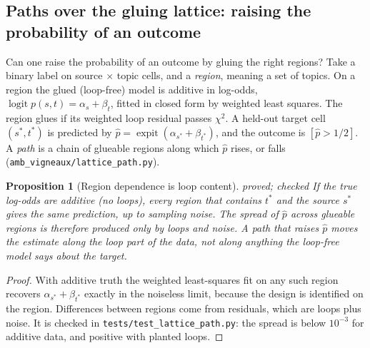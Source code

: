 \documentclass[11pt]{article}
\newtheorem{proposition}[theorem]{Proposition}
\theoremstyle{definition}
\theoremstyle{remark}
\newcommand{\st}[1]{\textsf{\small\color{gray}#1}}
\begin{document}
\subsection{Paths over the gluing lattice: raising the probability of an outcome}\label{sec:latticepath}
Can one raise the probability of an outcome by gluing the right regions? Take a binary label on source $\times$ topic cells, and a \emph{region}, meaning a set of topics. On a region the glued (loop-free) model is additive in log-odds, $\operatorname{logit}p(s,t)=\alpha_s+\beta_t$, fitted in closed form by weighted least squares. The region glues if its weighted loop residual passes $\chi^2$. A held-out target cell $(s^*,t^*)$ is predicted by $\hat p=\operatorname{expit}(\alpha_{s^*}+\beta_{t^*})$, and the outcome is $[\hat p>1/2]$. A \emph{path} is a chain of glueable regions along which $\hat p$ rises, or falls (\texttt{amb\_vigneaux/lattice\_path.py}).

\begin{proposition}[Region dependence is loop content]\label{prop:regioninv}\st{proved; checked}
If the true log-odds are additive (no loops), every region that contains $t^*$ and the source $s^*$ gives the same prediction, up to sampling noise. The spread of $\hat p$ across glueable regions is therefore produced only by loops and noise. A path that raises $\hat p$ moves the estimate along the loop part of the data, not along anything the loop-free model says about the target.
\end{proposition}
\begin{proof}
With additive truth the weighted least-squares fit on any such region recovers $\alpha_{s^*}+\beta_{t^*}$ exactly in the noiseless limit, because the design is identified on the region. Differences between regions come from residuals, which are loops plus noise. It is checked in \texttt{tests/test\_lattice\_path.py}: the spread is below $10^{-3}$ for additive data, and positive with planted loops.
\end{proof}
\end{document}
